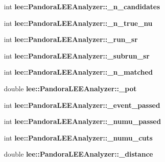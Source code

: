 \begin{DoxyCompactItemize}
\item 
\hypertarget{group__lee_gab3b7dc079f30897ba737c933e4905b76}{int {\bfseries lee\-::\-Pandora\-L\-E\-E\-Analyzer\-::\-\_\-n\-\_\-candidates}}\label{group__lee_gab3b7dc079f30897ba737c933e4905b76}

\item 
\hypertarget{group__lee_ga4c4794a897538d3307008962f0b96315}{int {\bfseries lee\-::\-Pandora\-L\-E\-E\-Analyzer\-::\-\_\-n\-\_\-true\-\_\-nu}}\label{group__lee_ga4c4794a897538d3307008962f0b96315}

\item 
\hypertarget{group__lee_gae9a94b51ad7618349eee1115c170679d}{int {\bfseries lee\-::\-Pandora\-L\-E\-E\-Analyzer\-::\-\_\-run\-\_\-sr}}\label{group__lee_gae9a94b51ad7618349eee1115c170679d}

\item 
\hypertarget{group__lee_gaba4424e8079da9de241fdd61d648a7f5}{int {\bfseries lee\-::\-Pandora\-L\-E\-E\-Analyzer\-::\-\_\-subrun\-\_\-sr}}\label{group__lee_gaba4424e8079da9de241fdd61d648a7f5}

\item 
\hypertarget{group__lee_ga49bf84147aebe0125c041e58ad39ea63}{int {\bfseries lee\-::\-Pandora\-L\-E\-E\-Analyzer\-::\-\_\-n\-\_\-matched}}\label{group__lee_ga49bf84147aebe0125c041e58ad39ea63}

\item 
\hypertarget{group__lee_gab9e2d69bbb1796181bfb0b73b3571327}{double {\bfseries lee\-::\-Pandora\-L\-E\-E\-Analyzer\-::\-\_\-pot}}\label{group__lee_gab9e2d69bbb1796181bfb0b73b3571327}

\item 
\hypertarget{group__lee_gae2220a696ef93026eca209bb981ffbdd}{int {\bfseries lee\-::\-Pandora\-L\-E\-E\-Analyzer\-::\-\_\-event\-\_\-passed}}\label{group__lee_gae2220a696ef93026eca209bb981ffbdd}

\item 
\hypertarget{group__lee_ga5358fd908f314be50f85ea97523fbca4}{int {\bfseries lee\-::\-Pandora\-L\-E\-E\-Analyzer\-::\-\_\-numu\-\_\-passed}}\label{group__lee_ga5358fd908f314be50f85ea97523fbca4}

\item 
\hypertarget{group__lee_ga50ca292dbf6464fa2845f4aed51f79b7}{int {\bfseries lee\-::\-Pandora\-L\-E\-E\-Analyzer\-::\-\_\-numu\-\_\-cuts}}\label{group__lee_ga50ca292dbf6464fa2845f4aed51f79b7}

\item 
\hypertarget{group__lee_ga67ddd5bec66667568bc59b0dfa13839a}{double {\bfseries lee\-::\-Pandora\-L\-E\-E\-Analyzer\-::\-\_\-distance}}\label{group__lee_ga67ddd5bec66667568bc59b0dfa13839a}


\end{DoxyCompactItemize}
